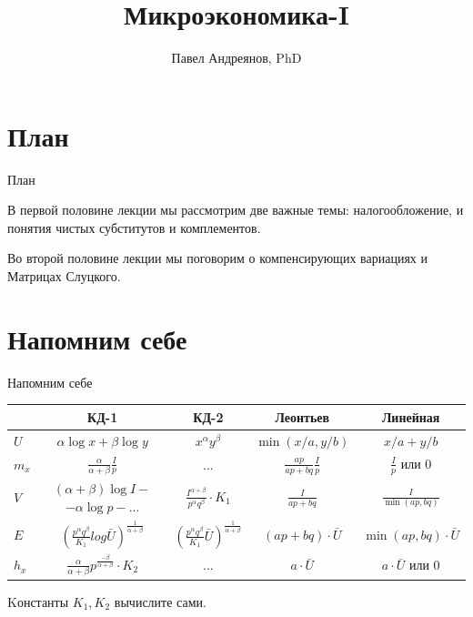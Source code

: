\documentclass{beamer}
\title{
Микроэкономика-I
}
\author{
Павел Андреянов, PhD
}
\begin{document}
\maketitle

\section{План}

\begin{frame}{План}

В первой половине лекции мы рассмотрим две важные темы: налогообложение, и  понятия чистых субститутов и комплементов.

Во второй половине лекции мы поговорим о компенсирующих вариациях и Матрицах Слуцкого.

\end{frame}


\section{Напомним себе}

\begin{frame}{Напомним себе}

\begin{table}[hbt]
\centering
\begin{adjustbox}{width=1\textwidth}
  \begin{tabular}{l|c|c|c|c|}
    & КД-1 & КД-2 & Леонтьев & Линейная \\
    \hline
    $U$ & $\alpha \log x + \beta \log y$ & $x^{\alpha} y^{\beta}$ & $\min(x/a, y/b)$ & $x/a + y/b$ \\
    \hline
    $m_x$ & $\frac{\alpha}{\alpha + \beta} \frac{I}{p}$ & ... & $\frac{ap}{ap+bq}\frac{I}{p}$ & $\frac{I}{p}$ или $0$ \\
    \hline
    $V$ & \makecell[l]{$(\alpha + \beta)\log I - $\\ $- \alpha \log p - ...$} & $\frac{I^{\alpha + \beta}}{p^{\alpha} q^{\beta}} \cdot K_1$ & $\frac{I}{ap + bq}$& $\frac{I}{\min(ap,bq)}$ \\
    \hline
    $E$ & $(\frac{p^{\alpha} q^{\beta}}{K_1} 
    log \bar U)^{\frac{1}{\alpha + \beta}}$ & $(\frac{p^{\alpha} q^{\beta}}{K_1} \bar U)^{\frac{1}{\alpha + \beta}}$ & $(ap+bq) \cdot \bar U$ & $\min(ap,bq) \cdot \bar U$\\
    \hline
    $h_x$ & $\frac{\alpha}{\alpha + \beta} p^{\frac{-\beta}{\alpha + \beta}} \cdot K_2$ & ... & $a \cdot \bar U$ & $a \cdot \bar U$ или $0$\\
    \hline
  \end{tabular}
  \end{adjustbox}
\end{table}
Kонстанты $K_1, K_2$ вычислите сами.


\end{frame}
\end{document}
